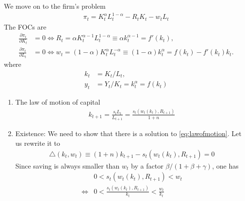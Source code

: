 \documentclass[11pt,a4paper]{book}
\theoremstyle{definition}\newtheorem{definition}{Definition}
\theoremstyle{definition}\newtheorem{fact}{Fact}
\theoremstyle{definition}\newtheorem{remark}{Remark}
\theoremstyle{definition}\newtheorem{ex}{Ex.}
\theoremstyle{definition}\newtheorem{project}{Project}
\theoremstyle{definition}\newtheorem{problem}{Problem}
\theoremstyle{definition}\newtheorem{example}{Example}
\numberwithin{theorem}{section}
\numberwithin{corollary}{chapter}
\numberwithin{assumption}{chapter}
\numberwithin{definition}{chapter}
\numberwithin{prop}{chapter}
\numberwithin{notation}{chapter}
\numberwithin{problem}{chapter}
\numberwithin{example}{chapter}
\numberwithin{fact}{chapter}
\numberwithin{ex}{chapter}
\begin{document}
\begin{appendices}
	We move on to the firm's problem
	\begin{align*}
		\pi_t = K_t^\alpha L_t^{1-\alpha} - R_t K_t - w_t L_t
	\end{align*}
	The FOCs are
	\begin{align*}
		\frac{\partial \pi_t}{\partial K_t} &= 0 \Leftrightarrow R_t = \alpha K_t^{\alpha-1} L_t^{1-\alpha} \equiv \alpha k_t^{\alpha-1} = f'(k_t), \\
		\frac{\partial \pi_t}{\partial L_t} &= 0 \Leftrightarrow w_t = (1-\alpha) K_t^\alpha L_t^{-\alpha} \equiv (1-\alpha)k_t^\alpha = f(k_t) - f'(k_t)k_t.
	\end{align*}
	where 
	\begin{align*}
		k_t &= K_t/L_t, \\
		y_t &= Y_t/K_t = k_t^\alpha = f(k_t) 
	\end{align*}
	\begin{enumerate}
		\item The law of motion of capital
	\begin{align}
		k_{t+1} = \frac{s_t L_t}{L_{t+1}} = \frac{s_t(w_t(k_t), R_{t+1})}{1+n} \label{eq:lawofmotion}
	\end{align}
		\item Existence: We need to show that there is a solution to \eqref{eq:lawofmotion}. Let us rewrite it to
		\begin{align*}
			\triangle (k_t, w_t) \equiv (1+n) k_{t+1} - s_t(w_t(k_t), R_{t+1}) = 0
		\end{align*}
		Since saving is always smaller than $w_t$ by a factor $\beta/(1+\beta+\gamma)$, one has
		\begin{align*}
			&0 < s_t(w_t(k_t), R_{t+1}) < w_t \\
			\Leftrightarrow & 0 < \frac{s_t(w_t(k_t), R_{t+1})}{k_t} < \frac{w_t}{k_t}
		\end{align*}
	\end{enumerate}
	
	
	

\end{appendices}
\end{document}
